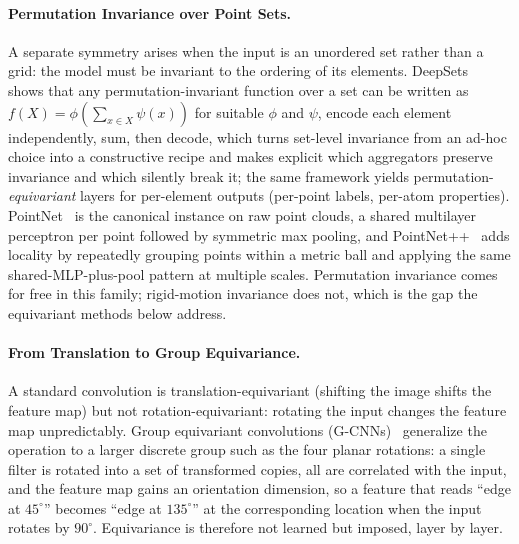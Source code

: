 \paragraph{Permutation Invariance over Point Sets.}
A separate symmetry arises when the input is an unordered set rather than a grid: the model must be invariant to the ordering of its elements.
DeepSets~\cite{zaheer2017deep} shows that any permutation-invariant function over a set can be written as $f(X)=\phi\!\left(\sum_{x\in X}\psi(x)\right)$ for suitable $\phi$ and $\psi$, encode each element independently, sum, then decode, which turns set-level invariance from an ad-hoc choice into a constructive recipe and makes explicit which aggregators preserve invariance and which silently break it; the same framework yields permutation-\emph{equivariant} layers for per-element outputs (per-point labels, per-atom properties).
PointNet~\cite{qi2017pointnet} is the canonical instance on raw point clouds, a shared multilayer perceptron per point followed by symmetric max pooling, and PointNet++~\cite{qi2017pointnetplus} adds locality by repeatedly grouping points within a metric ball and applying the same shared-MLP-plus-pool pattern at multiple scales.
Permutation invariance comes for free in this family; rigid-motion invariance does not, which is the gap the equivariant methods below address.

\paragraph{From Translation to Group Equivariance.}
A standard convolution is translation-equivariant (shifting the image shifts the feature map) but not rotation-equivariant: rotating the input changes the feature map unpredictably.
Group equivariant convolutions (G-CNNs)~\cite{cohen2016group} generalize the operation to a larger discrete group such as the four planar rotations: a single filter is rotated into a set of transformed copies, all are correlated with the input, and the feature map gains an orientation dimension, so a feature that reads ``edge at $45^\circ$'' becomes ``edge at $135^\circ$'' at the corresponding location when the input rotates by $90^\circ$.
Equivariance is therefore not learned but imposed, layer by layer.

